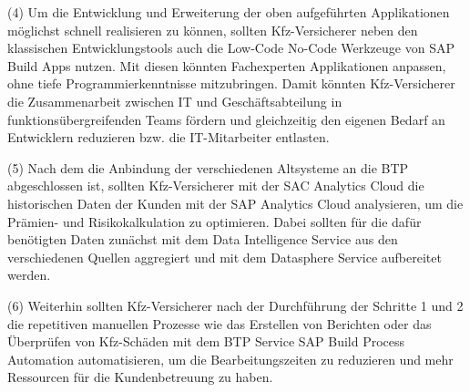 (4) Um die Entwicklung und Erweiterung der oben aufgeführten Applikationen möglichst schnell realisieren zu können, sollten Kfz-Versicherer neben den klassischen Entwicklungstools auch die Low-Code No-Code Werkzeuge von SAP Build Apps nutzen. Mit diesen könnten Fachexperten Applikationen anpassen, ohne tiefe Programmierkenntnisse mitzubringen. Damit könnten Kfz-Versicherer die Zusammenarbeit zwischen IT und Geschäftsabteilung in funktionsübergreifenden Teams fördern und gleichzeitig den eigenen Bedarf an Entwicklern reduzieren bzw. die IT-Mitarbeiter entlasten.

(5) Nach dem die Anbindung der verschiedenen Altsysteme an die BTP abgeschlossen ist, sollten Kfz-Versicherer mit der SAC Analytics Cloud die historischen Daten der Kunden mit der SAP Analytics Cloud analysieren, um die Prämien- und Risikokalkulation zu optimieren. Dabei sollten für die dafür benötigten Daten zunächst mit dem Data Intelligence Service aus den verschiedenen Quellen aggregiert und mit dem Datasphere Service aufbereitet werden.

(6) Weiterhin sollten Kfz-Versicherer nach der Durchführung der Schritte 1 und 2 die repetitiven manuellen Prozesse wie das Erstellen von Berichten oder das Überprüfen von Kfz-Schäden mit dem BTP Service SAP Build Process Automation automatisieren, um die Bearbeitungszeiten zu reduzieren und mehr Ressourcen für die Kundenbetreuung zu haben.







